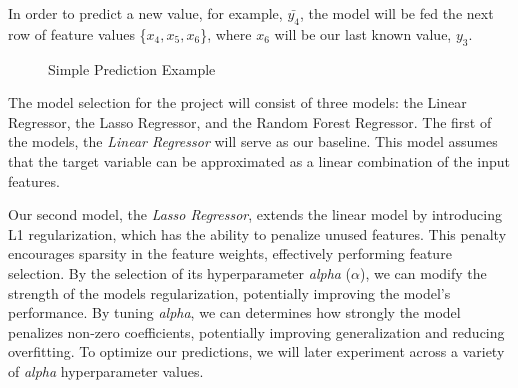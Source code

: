 \documentclass[12pt]{report} %
\begin{document}
In order to predict a new value, for example, $\bar{y_4}$, the model will be fed the next row of feature values \{$x_4, x_5, x_6$\}, where $x_6$ will be our last known value, $y_3$.

\begin{figure}[H]
    \centering
    \caption{Simple Prediction Example}
    \label{fig:pred_example}
\end{figure}


The model selection for the project will consist of three models: the Linear Regressor, the Lasso Regressor, and the Random Forest Regressor. The first of the models, the \textit{Linear Regressor} will serve as our baseline. This model assumes that the target variable can be approximated as a linear combination of the input features.


Our second model, the \textit{Lasso Regressor}, extends the linear model by introducing L1 regularization, which has the ability to penalize unused features. This penalty encourages sparsity in the feature weights, effectively performing feature selection. By the selection of its hyperparameter \textit{alpha} ($\alpha$), we can modify the strength of the models regularization, potentially improving the model's performance. By tuning \textit{alpha}, we can determines how strongly the model penalizes non-zero coefficients, potentially improving generalization and reducing overfitting. To optimize our predictions, we will later experiment across a variety of \textit{alpha} hyperparameter values.
\end{document}
